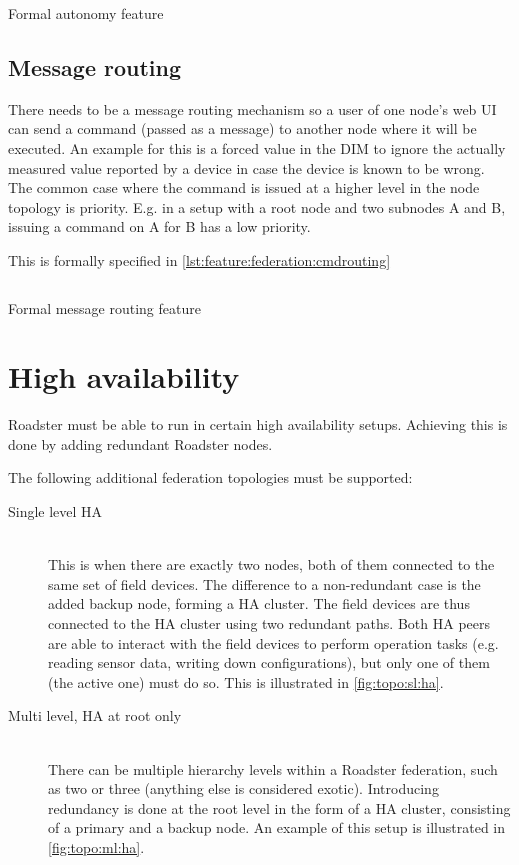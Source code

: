 \begin{listing}
	\inputminted{Gherkin}{listings/features/federation/autonomy.feature}
	\caption{Formal autonomy feature}
	\label{lst:feature:federation:autonomy}
\end{listing}

\subsection{Message routing}
There needs to be a message routing mechanism so a user
of one node's web UI can send a command (passed as a message) to another node where it will be
executed. An example for this is a forced value in the DIM to ignore the
actually measured value reported by a device in case the device is known to be
wrong. The common case where the command is issued at a higher level in the node
topology is priority. E.g. in a setup with a root node and two
subnodes A and B, issuing a command on A for B has a low priority.

This is formally specified in \autoref{lst:feature:federation:cmdrouting}

\begin{listing}
	\inputminted{Gherkin}{listings/features/federation/message_routing.feature}
	\caption{Formal message routing feature}
	\label{lst:feature:federation:cmdrouting}
\end{listing}

\section{High availability}
Roadster must be able to run in certain high availability setups. Achieving
this is done by adding redundant Roadster nodes.

The following additional federation topologies must be supported:
\begin{description}
	\item [ Single level \gls{HA} ] \hfill\\
		This is when there are exactly two nodes, both of them
		connected to the same set of field devices. The difference to a
		non-redundant case is the added backup node, forming a HA
		cluster. The field devices are thus connected to the HA cluster
		using two redundant paths. Both HA peers are able to interact
		with the field devices to perform operation tasks (e.g. reading
		sensor data, writing down configurations), but only one of them
		(the active one) must do so. This is illustrated in
		\autoref{fig:topo:sl:ha}.

	\item [ Multi level, \gls{HA} at root only ] \hfill\\
		There can be multiple hierarchy levels within a Roadster federation, such as two or
		three (anything else is considered exotic). Introducing
		redundancy is done at the root level in the form of a HA
		cluster, consisting of a primary and a backup node. An example of this setup is illustrated in
		\autoref{fig:topo:ml:ha}.
\end{description}

